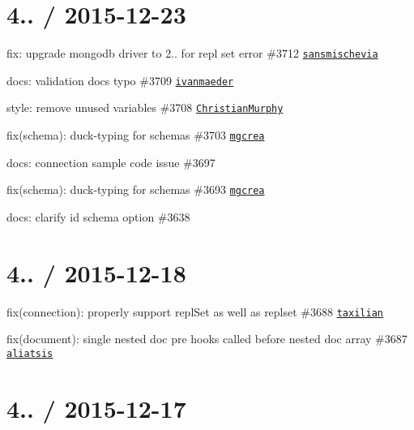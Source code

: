 \section*{4.. / 2015-\/12-\/23 }


\begin{DoxyItemize}
\item fix\+: upgrade mongodb driver to 2.. for repl set error \#3712 \href{https://github.com/sansmischevia}{\tt sansmischevia}
\item docs\+: validation docs typo \#3709 \href{https://github.com/ivanmaeder}{\tt ivanmaeder}
\item style\+: remove unused variables \#3708 \href{https://github.com/ChristianMurphy}{\tt Christian\+Murphy}
\item fix(schema)\+: duck-\/typing for schemas \#3703 \href{https://github.com/mgcrea}{\tt mgcrea}
\item docs\+: connection sample code issue \#3697
\item fix(schema)\+: duck-\/typing for schemas \#3693 \href{https://github.com/mgcrea}{\tt mgcrea}
\item docs\+: clarify id schema option \#3638
\end{DoxyItemize}

\section*{4.. / 2015-\/12-\/18 }


\begin{DoxyItemize}
\item fix(connection)\+: properly support \textquotesingle{}repl\+Set\textquotesingle{} as well as \textquotesingle{}replset\textquotesingle{} \#3688 \href{https://github.com/taxilian}{\tt taxilian}
\item fix(document)\+: single nested doc pre hooks called before nested doc array \#3687 \href{https://github.com/aliatsis}{\tt aliatsis}
\end{DoxyItemize}

\section*{4.. / 2015-\/12-\/17 }


